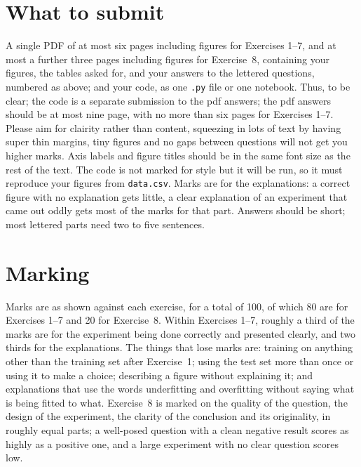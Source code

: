 \documentclass[11pt,a4paper]{article}
\newcounter{exercise}
\begin{document}
\section*{What to submit}

A single PDF of at most six pages including figures for Exercises
1--7, and at most a further three pages including figures for
Exercise~8, containing your figures, the tables asked for, and your
answers to the lettered questions, numbered as above; and your code,
as one \texttt{.py} file or one notebook. Thus, to be clear; the code
is a separate submission to the pdf answers; the pdf answers should be
at most nine page, with no more than six pages for Exercises
1--7. Please aim for clairity rather than content, squeezing in lots
of text by having super thin margins, tiny figures and no gaps between
questions will not get you higher marks. Axis labels and figure titles
should be in the same font size as the rest of the text.  The code is
not marked for style but it will be run, so it must reproduce your
figures from \texttt{data.csv}. Marks are for the explanations: a
correct figure with no explanation gets little, a clear explanation of
an experiment that came out oddly gets most of the marks for that
part. Answers should be short; most lettered parts need two to five
sentences.

\section*{Marking}

Marks are as shown against each exercise, for a total of 100, of which
80 are for Exercises 1--7 and 20 for Exercise~8. Within Exercises
1--7, roughly a third of the marks are for the experiment being done
correctly and presented clearly, and two thirds for the
explanations. The things that lose marks are: training on anything
other than the training set after Exercise~1; using the test set more
than once or using it to make a choice; describing a figure without
explaining it; and explanations that use the words underfitting and
overfitting without saying what is being fitted to what. Exercise~8 is
marked on the quality of the question, the design of the experiment,
the clarity of the conclusion and its originality, in roughly equal
parts; a well-posed question with a clean negative result scores as
highly as a positive one, and a large experiment with no clear
question scores low.
\end{document}
